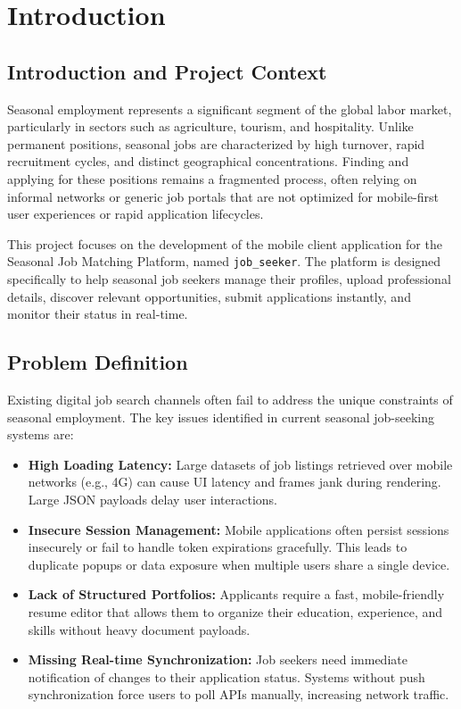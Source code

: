 \chapter{Introduction}
\label{ch:introduction}

\section{Introduction and Project Context}
Seasonal employment represents a significant segment of the global labor market, particularly in sectors such as agriculture, tourism, and hospitality. Unlike permanent positions, seasonal jobs are characterized by high turnover, rapid recruitment cycles, and distinct geographical concentrations. Finding and applying for these positions remains a fragmented process, often relying on informal networks or generic job portals that are not optimized for mobile-first user experiences or rapid application lifecycles.

This project focuses on the development of the mobile client application for the Seasonal Job Matching Platform, named \texttt{job\_seeker}. The platform is designed specifically to help seasonal job seekers manage their profiles, upload professional details, discover relevant opportunities, submit applications instantly, and monitor their status in real-time.

\section{Problem Definition}
Existing digital job search channels often fail to address the unique constraints of seasonal employment. The key issues identified in current seasonal job-seeking systems are:
\begin{itemize}
    \item \textbf{High Loading Latency:} Large datasets of job listings retrieved over mobile networks (e.g., 4G) can cause UI latency and frames jank during rendering. Large JSON payloads delay user interactions.
    \item \textbf{Insecure Session Management:} Mobile applications often persist sessions insecurely or fail to handle token expirations gracefully. This leads to duplicate popups or data exposure when multiple users share a single device.
    \item \textbf{Lack of Structured Portfolios:} Applicants require a fast, mobile-friendly resume editor that allows them to organize their education, experience, and skills without heavy document payloads.
    \item \textbf{Missing Real-time Synchronization:} Job seekers need immediate notification of changes to their application status. Systems without push synchronization force users to poll APIs manually, increasing network traffic.
\end{itemize}

